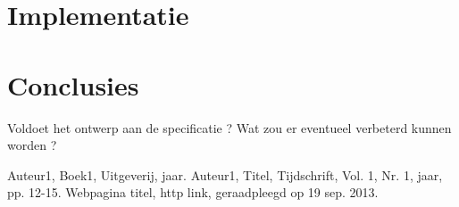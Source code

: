 \documentclass[11pt,twoside,a4paper]{article}
\begin{document}
\section{Implementatie}


\section{Conclusies}

Voldoet het ontwerp aan de specificatie ?
Wat zou er eventueel verbeterd kunnen worden ?

\begin{thebibliography}{9}
Auteur1, 
Boek1, 
Uitgeverij, 
jaar.
Auteur1, 
Titel, 
Tijdschrift, 
Vol. 1, 
Nr. 1, 
jaar, 
pp. 12-15.
Webpagina titel, 
http link, 
geraadpleegd op 19 sep. 2013.
\end{thebibliography}
\end{document}
